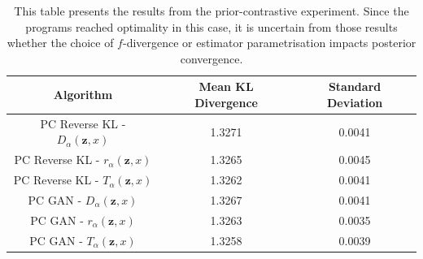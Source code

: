 \documentclass[honours,12pt]{unswthesis}
\numberwithin{equation}{section}
\theoremstyle{definition}
\begin{document}
\newpage

\begin{table}[h!]
\centering
\begin{tabular}{|c|c|c|}
\hline
Algorithm & Mean KL Divergence & Standard Deviation\\
\hline
PC Reverse KL - $D_\alpha(\bm{z},x)$ & 1.3271 & 0.0041\\
\hline
PC Reverse KL - $r_\alpha(\bm{z},x)$ & 1.3265 & 0.0045\\
\hline
PC Reverse KL - $T_\alpha(\bm{z},x)$ & 1.3262 & 0.0041\\
\hline
PC GAN - $D_\alpha(\bm{z},x)$ & 1.3267 & 0.0041\\
\hline
PC GAN - $r_\alpha(\bm{z},x)$ & 1.3263 & 0.0035\\
\hline
PC GAN - $T_\alpha(\bm{z},x)$ & 1.3258 & 0.0039\\
\hline
\end{tabular}
\caption{\small This table presents the results from the prior-contrastive experiment. Since the programs reached optimality in this case, it is uncertain from those results whether the choice of $f$-divergence or estimator parametrisation impacts posterior convergence.}
\label{tab:6.1}
\end{table}
\end{document}
